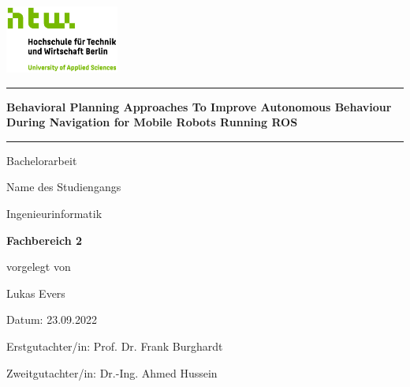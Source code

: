 \begin{titlepage}

\begin{center}
\includegraphics[width=0.28\textwidth,keepaspectratio]{images/HTW_Logo_rgb.jpg}
\end{center}

\bigskip
\bigskip 
\bigskip 
\bigskip 

\par\noindent\rule{\textwidth}{0.4pt}

\bigskip 
\bigskip 
\bigskip 
 
\begin{center}
	\begin{Large}
		\color{htwgreen}
		\textbf{Behavioral Planning Approaches To Improve Autonomous Behaviour During
Navigation for Mobile Robots Running ROS}
	\end{Large}
	
	\bigskip 
	\bigskip 
	\par\noindent\rule{\textwidth}{0.4pt}
	
	\medskip 
	Bachelorarbeit
	\bigskip 
	\bigskip
	\bigskip 
	\bigskip 
	\bigskip 
	\bigskip
	\bigskip 
	\bigskip 

	\bigskip 
	Name des Studiengangs\\
	
	\medskip
	\begin{Large}
		Ingenieurinformatik
	\end{Large}
	
	\bigskip 
	\begin{Large}
		\color{htwgreen}
		\textbf{Fachbereich 2}
	\end{Large}

	\bigskip 
	vorgelegt von \\
		
	\begin{Large}
		Lukas Evers\\
		
	\end{Large}
	
	\bigskip 
	\bigskip 
	\bigskip 
	\bigskip 
	\bigskip 
	\bigskip 
	\bigskip 
	\bigskip 
	\bigskip 
	\bigskip 
	\bigskip 
	\bigskip 
	
	\bigskip 
	\bigskip 
	\bigskip 
	
	\bigskip 
	\bigskip
	Datum:
	23.09.2022\\
	\bigskip
	
	\begin{Large}
		Erstgutachter/in: Prof. Dr. Frank Burghardt \\
		
	\end{Large}
	
	\begin{Large}
		Zweitgutachter/in: Dr.-Ing. Ahmed Hussein \\
		
	\end{Large}


\end{center}

\end{titlepage}